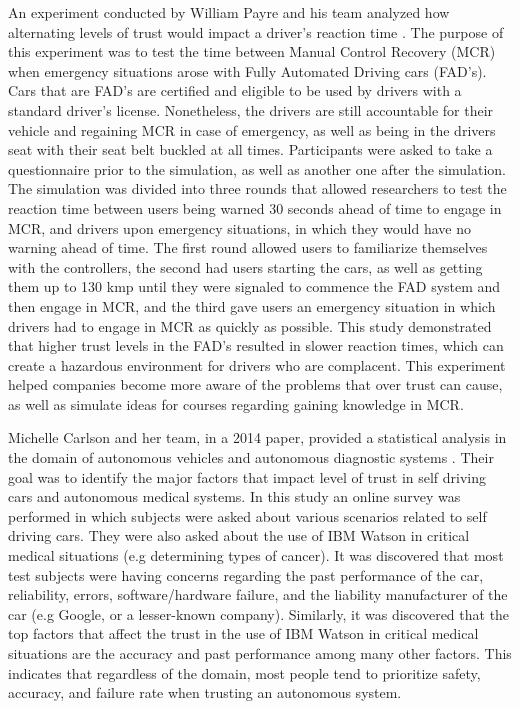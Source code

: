 \documentclass[runningheads,a4paper]{llncs}
\begin{document}
An experiment  conducted by William Payre and his team analyzed how alternating levels of trust would impact a driver's reaction time \cite{payre2016fully}.  The purpose of this experiment was to test the time between Manual Control Recovery (MCR) when emergency situations arose with Fully Automated Driving cars (FAD's).  Cars that are FAD's are certified and eligible to be used by drivers with a standard driver's license.  Nonetheless, the drivers are still accountable for their vehicle and regaining MCR in case of emergency, as well as being in the drivers seat with their seat belt buckled at all times.  Participants were asked to take a questionnaire prior to the simulation, as well as another one after the simulation.  The simulation was divided into three rounds that allowed researchers to test the reaction time between users being warned 30 seconds ahead of time to engage in MCR, and drivers upon emergency situations, in which they would have no warning ahead of time.  The first round allowed users to familiarize themselves with the controllers, the second had users starting the cars, as well as getting them up to 130 kmp until they were signaled to commence the FAD system and then engage in MCR, and the third gave users an emergency situation in which drivers had to engage in MCR as quickly as possible.  This study demonstrated that higher trust levels in the FAD's resulted in slower reaction times, which can create a hazardous environment for drivers who are complacent.  This experiment helped companies become more aware of the problems that over trust can cause, as well as simulate ideas for courses regarding gaining knowledge in MCR.

Michelle Carlson and her team, in a 2014 paper, provided a statistical analysis in the domain of autonomous vehicles and autonomous diagnostic systems \cite{carlson2014identifying}. Their goal was to identify the major factors that impact level of trust in self driving cars and autonomous medical systems. In this study an online survey was performed in which subjects were asked about various scenarios related to self driving cars. They were also asked about the use of IBM Watson in critical medical situations (e.g determining types of cancer). It was discovered that most test subjects were having concerns regarding the past performance of the car, reliability, errors, software/hardware failure, and the liability manufacturer of the car (e.g Google, or a lesser-known company). Similarly, it was discovered that the top factors that affect the trust in the use of IBM Watson in critical medical situations are the accuracy and past performance among many other factors. This indicates that regardless of the domain, most people tend to prioritize safety, accuracy, and failure rate when trusting an autonomous system.
\end{document}
